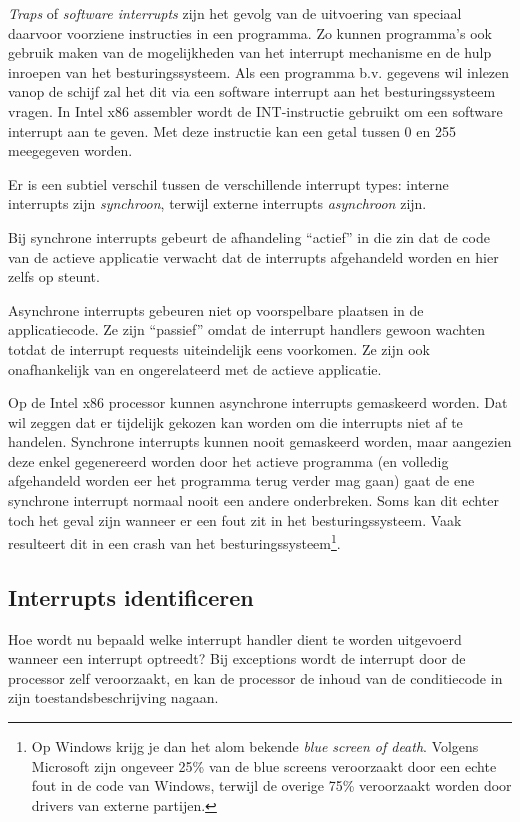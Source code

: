 \emph{Traps} of \emph{software interrupts} zijn het gevolg van de uitvoering van speciaal
daarvoor voorziene instructies in een programma. Zo kunnen programma's
ook gebruik maken van de mogelijkheden van het interrupt mechanisme en
de hulp inroepen van het besturingssysteem. Als een programma b.v.
gegevens wil inlezen vanop de schijf zal het dit via een software
interrupt aan het besturingssysteem vragen. In Intel x86 assembler wordt de INT-instructie gebruikt om een
software interrupt aan te geven. Met deze instructie kan een getal
tussen 0 en 255 meegegeven worden.

Er is een subtiel verschil tussen de verschillende interrupt types: interne interrupts zijn
\emph{synchroon}, terwijl externe interrupts \emph{asynchroon} zijn.

Bij synchrone interrupts gebeurt de afhandeling ``actief'' in die zin dat de code van de
actieve applicatie verwacht dat de interrupts afgehandeld worden en hier zelfs op steunt.

Asynchrone interrupts gebeuren niet op voorspelbare plaatsen in de applicatiecode. Ze zijn
``passief'' omdat de interrupt handlers gewoon wachten totdat de interrupt requests
uiteindelijk eens voorkomen. Ze zijn ook onafhankelijk van en ongerelateerd met de actieve applicatie.

Op de Intel x86 processor kunnen asynchrone interrupts gemaskeerd worden. Dat wil zeggen
dat er tijdelijk gekozen kan worden om die interrupts niet af te handelen. Synchrone
interrupts kunnen nooit gemaskeerd worden, maar aangezien deze enkel gegenereerd worden
door het actieve programma (en volledig afgehandeld worden eer het programma terug verder mag
gaan) gaat de ene synchrone interrupt normaal nooit een andere onderbreken. Soms kan dit 
echter toch het geval zijn wanneer er een fout zit in het besturingssysteem. Vaak resulteert
dit in een crash van het besturingssysteem\footnote{Op Windows krijg je dan het alom bekende 
\emph{blue screen of death}. Volgens Microsoft zijn ongeveer 25\% van de blue screens veroorzaakt
door een echte fout in de code van Windows, terwijl de overige 75\% veroorzaakt worden door drivers
van externe partijen.}.

\subsection{Interrupts identificeren}

Hoe wordt nu bepaald welke interrupt handler dient te worden
uitgevoerd wanneer een interrupt optreedt? Bij exceptions wordt de
interrupt door de processor zelf veroorzaakt, en kan de processor de
inhoud van de conditiecode in zijn toestandsbeschrijving
nagaan.

